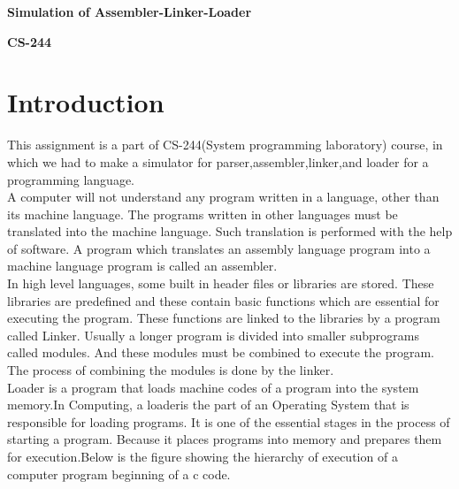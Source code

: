 \documentclass[12pt]{article}
\begin{document}
\begin{titlepage}
    \begin{center}
        \vspace*{8cm}
        
        \Huge
        \textbf{Simulation of Assembler-Linker-Loader}
        
        \vspace{1.0cm}
        \LARGE

        
        \vspace{0.2cm}
        
        \textbf{CS-244}
        
        
        
    \end{center}
\end{titlepage}
 \newpage
\tableofcontents
\newpage

\section{Introduction}

This assignment is a part of CS-244(System programming laboratory) course, in which we had to make a simulator for parser,assembler,linker,and loader for a programming language.\\
A  computer  will  not  understand  any  program  written  in  a 
language,  other  than  its  machine  language.  The  programs  written  in  other 
languages  must  be  translated  into  the  machine  language.  Such  translation 
is  performed  with  the  help  of  software.  A  program  which  translates  an 
assembly  language  program  into  a  machine  language  program  is  called  an 
assembler.\\In  high  level  languages,  some  built  in  header  files  or  libraries  are 
stored.  These  libraries  are  predefined 
and  these  contain  basic  functions 
which are essential for executing the program. These functions are linked to 
the libraries by a program called Linker. Usually  a  longer  program  is  divided  into  smaller 
subprograms  called  modules.  And  these  modules  must  be  combined  to 
execute the program. The process of combining the modules is done by the 
linker.\\Loader is a program that loads machine codes of a program into the 
system   memory.In Computing,   a loaderis   the   part   of   an Operating  System
that  is  responsible  for  loading  programs.  It  is  one  of  the  essential 
stages in the process of starting a program. Because it places programs into 
memory  and  prepares  them  for  execution.Below is the figure showing the hierarchy of execution of a computer program beginning of a c code.
\end{document}
